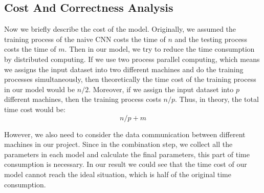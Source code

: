 



\subsection{Cost And Correctness Analysis}
\label{subsect:costanalysis}
Now we briefly describe the cost of the model. Originally, we assumed the training process of the naive CNN costs the time of $n$ and the testing process costs the time of $m$. Then in our model, we try to reduce the time consumption by distributed computing. If we use two process parallel computing, which means we assigns the input dataset into two different machines and do the training processes simultaneously, then theoretically the time cost of the training process in our model would be $n/2$. Moreover, if we assign the input dataset into $p$ different machines, then the training process costs $n/p$. Thus, in theory, the total time cost would be:
\begin{equation}
n/p+m
\end{equation}

However, we also need to consider the data communication between different machines in our project. Since in the combination step, we collect all the parameters in each model and calculate the final parameters, this part of time consumption is necessary. In our result we could see that the time cost of our model cannot reach the ideal situation, which is half of the original time consumption. 

